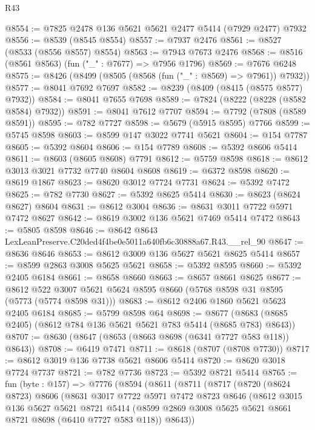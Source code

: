\begin{lexlean}{R43}
\begin{coremodule}
@8554 := @7825 @2478 @136 @5621 @5621 @2477 @5414 (@7929 @2477) @7932
@8556 := @8539 (@8545 @8554)
@8557 := @7937 @2476
@8561 := @8527 (@8533 (@8556 @8557) @8554)
@8563 := @7943 @7673 @2476
@8568 := @8516 (@8561 @8563) (fun ("_" : @7677) => @7956 @1796)
@8569 := @7676 @6248
@8575 := @8426 (@8499 (@8505 (@8568 (fun ("_" : @8569) => @7961)) @7932))
@8577 := @8041 @7692 @7697
@8582 := @8239 (@8409 (@8415 (@8575 @8577) @7932))
@8584 := @8041 @7655 @7698
@8589 := @7824 (@8222 (@8228 (@8582 @8584) @7932))
@8591 := @8041 @7612 @7707
@8594 := @7792 (@7808 (@8589 @8591))
@8595 := @782 @7727
@8598 := @5679 (@5915 @8595) @7766
@8599 := @5745 @8598
@8603 := @8599 @147 @3022 @7741 @5621
@8604 := @154 @7787
@8605 := @5392 @8604
@8606 := @154 @7789
@8608 := @5392 @8606 @5414
@8611 := @8603 (@8605 @8608) @7791
@8612 := @5759 @8598
@8618 := @8612 @3013 @3021 @7732 @7740 @8604 @8608
@8619 := @6372 @8598
@8620 := @8619 @1867
@8623 := @8620 @3012 @7724 @7731
@8624 := @5392 @7472
@8625 := @782 @7730
@8627 := @5392 @8625 @5414
@8630 := @8623 (@8624 @8627) @8604
@8631 := @8612 @3004
@8636 := @8631 @3011 @7722 @5971 @7472 @8627
@8642 := @8619 @3002 @136 @5621 @7469 @5414 @7472
@8643 := @5805 @8598
@8646 := @8642 @8643 LexLeanPreserve.C20ded4f4be0e5011a640fb6c30888a67.R43.__rel_90
@8647 := @8636 @8646
@8653 := @8612 @3009 @136 @5627 @5621 @8625 @5414
@8657 := @8599 @2863 @3008 @5625 @5621
@8658 := @5392 @8595
@8660 := @5392 @2405 @6184
@8661 := @8658 @8660
@8663 := @8657 @8661 @8625
@8677 := @8612 @522 @3007 @5621 @5624 @8595 @8660 (@5768 @8598 @31 @8595 (@5773 (@5774 @8598 @31)))
@8683 := @8612 @2406 @1860 @5621 @5623 @2405 @6184
@8685 := @5799 @8598 @64
@8698 := @8677 (@8683 (@8685 @2405) (@8612 @784 @136 @5621 @5621 @783 @5414 (@8685 @783) @8643))
@8707 := @8630 (@8647 (@8653 (@8663 @8698 (@6341 @7727 @583 @118)) @8643))
@8708 := @6419 @7471
@8711 := @8618 (@8707 (@8708 @7730))
@8717 := @8612 @3019 @136 @7738 @5621 @8606 @5414
@8720 := @8620 @3018 @7724 @7737
@8721 := @782 @7736
@8723 := @5392 @8721 @5414
@8765 := fun (byte : @157) =>
  @7776
    (@8594
      (@8611
        (@8711
          (@8717
            (@8720
              (@8624 @8723)
              @8606
              (@8631
                @3017
                @7722
                @5971
                @7472
                @8723
                @8646
                (@8612
                  @3015
                  @136
                  @5627
                  @5621
                  @8721
                  @5414
                  (@8599 @2869 @3008 @5625 @5621 @8661 @8721 @8698 (@6410 @7727 @583 @118))
                  @8643))

\end{coremodule}
\end{lexlean}
